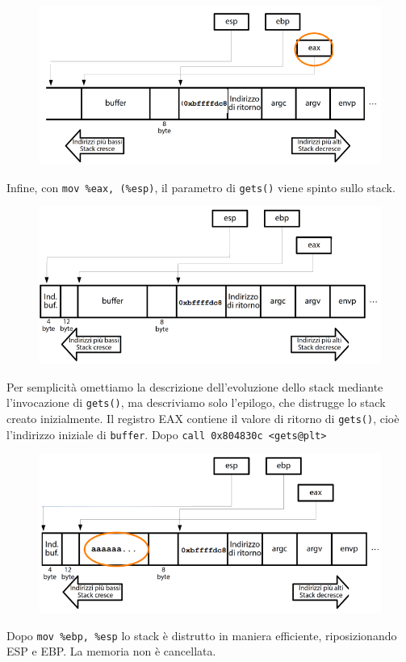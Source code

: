 \begin{figure}[hbpt!]
    \centering
    \includegraphics[width= 0.6 \textwidth]{./Images/cap7/7.13.png}
\end{figure}
\FloatBarrier

Infine, con \texttt{mov \%eax, (\%esp)}, il parametro di \texttt{gets()} viene spinto sullo stack.

\begin{figure}[hbpt!]
    \centering
    \includegraphics[width= 0.6 \textwidth]{./Images/cap7/7.14.png}
\end{figure}
\FloatBarrier

Per semplicità omettiamo la descrizione dell'evoluzione dello stack mediante l'invocazione di \texttt{gets()}, ma descriviamo solo l'epilogo, che distrugge lo stack creato inizialmente. Il registro EAX contiene il valore di ritorno di \texttt{gets()}, cioè l'indirizzo iniziale di \texttt{buffer}. Dopo \texttt{call 0x804830c <gets@plt>}

\begin{figure}[hbpt!]
    \centering
    \includegraphics[width= 0.6 \textwidth]{./Images/cap7/7.15.png}
\end{figure}
\FloatBarrier

Dopo \texttt{mov \%ebp, \%esp} lo stack è distrutto in maniera efficiente, riposizionando ESP e EBP. La memoria non è cancellata.


